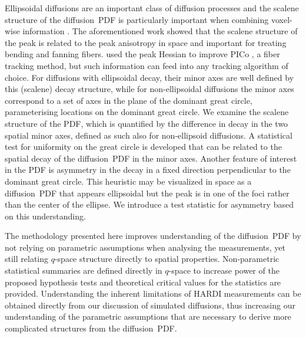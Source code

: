 \documentclass[dvips,aoas,preprint]{imsart}
\numberwithin{equation}{section}
\theoremstyle{plain}
\begin{document}
Ellipsoidal diffusions are an important class of diffusion processes
and the scalene structure of the diffusion~PDF is particularly
important when combining voxel-wise information \citep{Seunarine}.
The aforementioned work showed that the scalene structure of the peak
is related to the peak anisotropy in space and important for treating
bending and fanning fibers.  \citet{Seunarine} used the peak Hessian
to improve PICo \citep{par-ale:pico}, a fiber tracking method, but
such information can feed into any tracking algorithm of choice.  For
diffusions with ellipsoidal decay, their minor axes are well defined
by this (scalene) decay structure, while for non-ellipsoidal
diffusions the minor axes correspond to a set of axes in the plane of
the dominant great circle, parameterising locations on the dominant
great circle.  We examine the scalene structure of the PDF, which is
quantified by the difference in decay in the two spatial minor axes,
defined as such also for non-ellipsoid diffusions.
A statistical test for uniformity on the great circle is developed
that can be related to the spatial decay of the diffusion~PDF in the
minor axes.  Another feature of interest in the PDF is asymmetry in
the decay in a fixed direction perpendicular to the dominant great
circle.  This heuristic may be visualized in space as a diffusion~PDF
that appears ellipsoidal but the peak is in one of the foci rather
than the center of the ellipse.  We introduce a test statistic for
asymmetry based on this understanding.


The methodology presented here improves understanding of the
diffusion~PDF by not relying on parametric assumptions when analysing
the measurements, yet still relating $q$-space structure directly to
spatial properties.  Non-parametric statistical summaries are defined
directly in $q$-space to increase power of the proposed hypothesis
tests and theoretical critical values for the statistics are provided.
Understanding the inherent limitations of HARDI measurements can be
obtained directly from our discussion of simulated diffusions, thus
increasing our understanding of the parametric assumptions that are
necessary to derive more complicated structures from the
diffusion~PDF.
\end{document}
